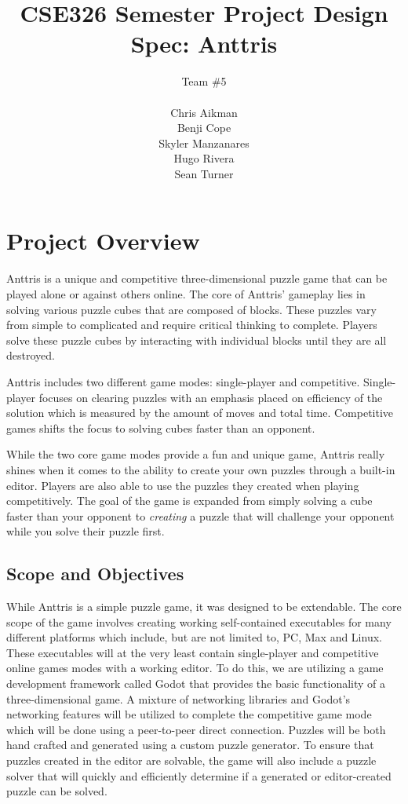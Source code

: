 \documentclass[12pt]{article}
\begin{document}
\title{CSE326 Semester Project Design Spec: Anttris}
\author{Team \#5\\\\Chris Aikman\\Benji Cope\\Skyler Manzanares\\Hugo Rivera\\Sean Turner}
\maketitle

\section{Project Overview} %
Anttris is a unique and competitive three-dimensional puzzle game that can be played alone or against others online. The core of Anttris' gameplay lies in solving various puzzle cubes that are composed of blocks. These puzzles vary from simple to complicated and require critical thinking to complete. Players solve these puzzle cubes by interacting with individual blocks until they are all destroyed.

Anttris includes two different game modes: single-player and competitive. Single-player focuses on clearing puzzles with an emphasis placed on efficiency of the solution which is measured by the amount of moves and total time. Competitive games shifts the focus to solving cubes faster than an opponent.

While the two core game modes provide a fun and unique game, Anttris really shines when it comes to the ability to create your own puzzles through a built-in editor. Players are also able to use the puzzles they created when playing competitively. The goal of the game is expanded from simply solving a cube faster than your opponent to \textsl{creating} a puzzle that will challenge your opponent while you solve their puzzle first.
\subsection{Scope and Objectives} %
While Anttris is a simple puzzle game, it was designed to be extendable. The core scope of the game involves creating working self-contained executables for many different platforms which include, but are not limited to, PC, Max and Linux. These executables will at the very least contain single-player and competitive online games modes with a working editor. To do this, we are utilizing a game development framework called Godot \cite{godot:gameengine} that provides the basic functionality of a three-dimensional game. A mixture of networking libraries and Godot's networking features will be utilized to complete the competitive game mode which will be done using a peer-to-peer direct connection. Puzzles will be both hand crafted and generated using a custom puzzle generator. To ensure that puzzles created in the editor are solvable, the game will also include a puzzle solver that will quickly and efficiently determine if a generated or editor-created puzzle can be solved.
\end{document}

